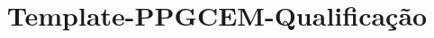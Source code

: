 


\title{Template-PPGCEM-Qualificação}

\pagestyle{fancy}




 

\renewcommand{\thepage}{\roman{page}} %
\setcounter{page}{1} %



	
\newpage


\newpage

\renewcommand\contentsname{{\hfill \uppercase{Índice de assuntos} \hfill }}
\tableofcontents
\newpage

\vspace*{-2.5cm}
\renewcommand{\listtablename}{\normalsize ÍNDICE DE TABELAS (OPCIONAL)}
\listoftables 
\newpage

\vspace*{-2.5cm}
\renewcommand{\listfigurename}{\normalsize ÍNDICE DE FIGURAS (OPCIONAL)}
\listoffigures
\newpage


\newpage


